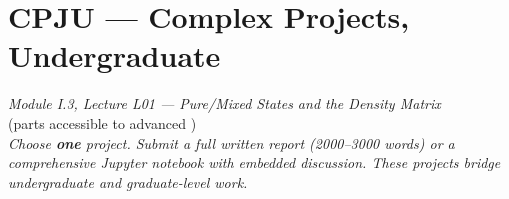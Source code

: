 \documentclass[11pt,a4paper]{article}
\begin{document}
\section*{CPJU --- Complex Projects, Undergraduate}
\begin{center}
  \textit{Module I.3, Lecture L01 --- Pure/Mixed States and the Density Matrix}\\[4pt]
   (parts accessible to advanced )\\[6pt]
  \textit{Choose \textbf{one} project. Submit a full written report (2000--3000 words)
  or a comprehensive Jupyter notebook with embedded discussion.
  These projects bridge undergraduate and graduate-level work.}
\end{center}

\bigskip
\end{document}
